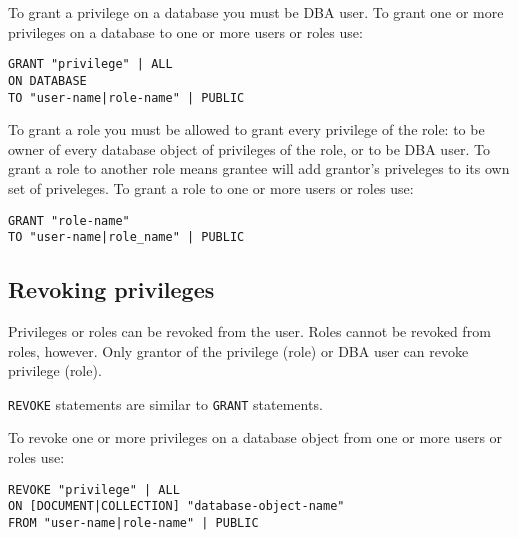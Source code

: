 \documentclass[a4paper,12pt]{article}
\begin{document}
To grant a privilege on a database you must be DBA user. To grant one or more privileges on a database to one or more users or roles use:


\begin{verbatim}
GRANT "privilege" | ALL
ON DATABASE
TO "user-name|role-name" | PUBLIC
\end{verbatim}

To grant a role you must be allowed to grant every privilege of the role: to be owner of every database object of privileges of the role, or to be DBA user. To grant a role to another role
means grantee will add grantor's priveleges to its own set of priveleges. To grant a role to one or more users or roles use:


\begin{verbatim}
GRANT "role-name"
TO "user-name|role_name" | PUBLIC
\end{verbatim}

\subsection{Revoking privileges}

Privileges or roles can be revoked from the user. Roles cannot be revoked from roles, however. Only grantor of the privilege (role) or DBA user can revoke privilege (role).

\verb!REVOKE! statements are similar to \verb!GRANT! statements.

To revoke one or more privileges on a database object from one or more users or roles use:


\begin{verbatim}
REVOKE "privilege" | ALL
ON [DOCUMENT|COLLECTION] "database-object-name"
FROM "user-name|role-name" | PUBLIC
\end{verbatim}
\end{document}
